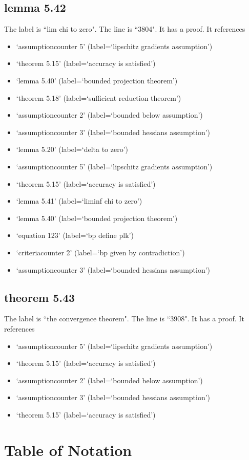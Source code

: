 \documentclass{article}
\begin{document}
\subsection{lemma 5.42}
The label is ``lim chi to zero".
The line is ``3804".
It has a proof.
It references \begin{itemize}
\item `assumptioncounter 5' (label=`lipschitz gradients assumption')
\item `theorem 5.15' (label=`accuracy is satisfied')
\item `lemma 5.40' (label=`bounded projection theorem')
\item `theorem 5.18' (label=`sufficient reduction theorem')
\item `assumptioncounter 2' (label=`bounded below assumption')
\item `assumptioncounter 3' (label=`bounded hessians assumption')
\item `lemma 5.20' (label=`delta to zero')
\item `assumptioncounter 5' (label=`lipschitz gradients assumption')
\item `theorem 5.15' (label=`accuracy is satisfied')
\item `lemma 5.41' (label=`liminf chi to zero')
\item `lemma 5.40' (label=`bounded projection theorem')
\item `equation 123' (label=`bp define plk')
\item `criteriacounter 2' (label=`bp given by contradiction')
\item `assumptioncounter 3' (label=`bounded hessians assumption')
\end{itemize}
\subsection{theorem 5.43}
The label is ``the convergence theorem".
The line is ``3908".
It has a proof.
It references \begin{itemize}
\item `assumptioncounter 5' (label=`lipschitz gradients assumption')
\item `theorem 5.15' (label=`accuracy is satisfied')
\item `assumptioncounter 2' (label=`bounded below assumption')
\item `assumptioncounter 3' (label=`bounded hessians assumption')
\item `theorem 5.15' (label=`accuracy is satisfied')
\end{itemize}
\section{Table of Notation}
\end{document}
